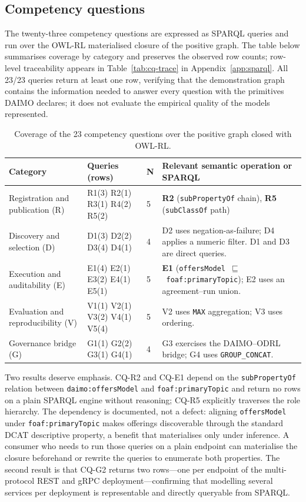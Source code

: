 \documentclass[Afour,sagev,times]{sagej}
\newcommand{\code}[1]{\texttt{#1}}
\begin{document}
\subsection{Competency questions}\label{sec:eval-cqs}

The twenty-three competency questions are expressed as SPARQL queries and run over the OWL-RL materialised closure of the positive graph. The table below summarises coverage by category and preserves the observed row counts; row-level traceability appears in Table~\ref{tab:cq-trace} in Appendix~\ref{app:sparql}. All 23/23 queries return at least one row, verifying that the demonstration graph contains the information needed to answer every question with the primitives DAIMO declares; it does not evaluate the empirical quality of the models represented.

\begin{table}[tb]
\scriptsize\sf\centering
\caption{Coverage of the 23 competency questions over the positive graph closed with OWL-RL.\label{tab:cqs}}
\begin{tabular}{@{}p{3.3cm}p{2.6cm}p{0.8cm}p{6.3cm}@{}}
\toprule
\textbf{Category} & \textbf{Queries (rows)} & \textbf{N} & \textbf{Relevant semantic operation or SPARQL} \\
\midrule
Registration and publication (R) & R1(3) R2(1) R3(1) R4(2) R5(2) & 5 & \textbf{R2} (\code{subPropertyOf} chain), \textbf{R5} (\code{subClassOf} path) \\
Discovery and selection (D) & D1(3) D2(2) D3(4) D4(1) & 4 & D2 uses negation-as-failure; D4 applies a numeric filter. D1 and D3 are direct queries. \\
Execution and auditability (E) & E1(4) E2(1) E3(2) E4(1) E5(1) & 5 & \textbf{E1} (\code{offersModel}~$\sqsubseteq$~\code{foaf:primaryTopic}); E2 uses an agreement--run union. \\
Evaluation and reproducibility (V) & V1(1) V2(1) V3(2) V4(1) V5(4) & 5 & V2 uses \code{MAX} aggregation; V3 uses ordering. \\
Governance bridge (G) & G1(1) G2(2) G3(1) G4(1) & 4 & G3 exercises the DAIMO--ODRL bridge; G4 uses \code{GROUP\_CONCAT}. \\
\bottomrule
\end{tabular}
\end{table}

Two results deserve emphasis. CQ-R2 and CQ-E1 depend on the \code{subPropertyOf} relation between \code{daimo:offersModel} and \code{foaf:primaryTopic} and return no rows on a plain SPARQL engine without reasoning; CQ-R5 explicitly traverses the role hierarchy. The dependency is documented, not a defect: aligning \code{offersModel} under \code{foaf:primaryTopic} makes offerings discoverable through the standard DCAT descriptive property, a benefit that materialises only under inference. A consumer who needs to run those queries on a plain endpoint can materialise the closure beforehand or rewrite the queries to enumerate both properties. The second result is that CQ-G2 returns two rows---one per endpoint of the multi-protocol REST and gRPC deployment---confirming that modelling several services per deployment is representable and directly queryable from SPARQL.
\end{document}
